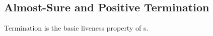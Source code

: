 

\vspace{-1em}
\subsection{Almost-Sure and Positive Termination}
\vspace{-0.5em}
Termination is the basic liveness property of \PP{}s. 


